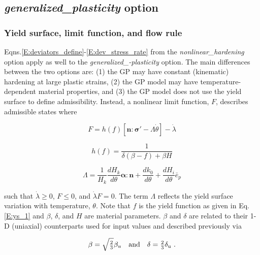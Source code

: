 \documentclass[11pt]{report}
\numberwithin{equation}{section}
\newcommand{\bmf } {\boldsymbol }
\newcommand{\bsf } [1]{\textrm{\textit{#1}}\xspace}
\begin{document}
\subsection {\bsf{generalized\_plasticity} option}
\subsubsection {Yield surface, limit function, and flow rule}
Eqns.\;\eqref{E:deviators_define}-\eqref{E:dev_stress_rate}
from the \textit{nonlinear\_hardening} option apply as well to the 
\textit{generalized\_-plasticity} option. The main differences between the two 
options are: (1) the GP may have constant (kinematic)
hardening at large plastic strains,  (2) the GP model may have temperature-dependent 
material properties,  and (3) the GP
model does not use the 
yield surface to define admissibility. Instead, a nonlinear 
limit function, $F$, describes admissible states where 

\begin{equation}
F = h(f)\left[ {\bmf{n}}:{\bmf{\sigma }}' -\Lambda \dot{\theta}  \right] - \dot \lambda 
\end{equation}

\begin{equation}
h(f) = \frac{1}{{\delta \left( {\beta  - f} \right) + \beta H }}
\end{equation}

\begin{equation}
\Lambda = \dfrac{1}{H_{k}}\dfrac{dH_{k}}{d\theta}\boldsymbol{\alpha}:\boldsymbol{n}
 +\frac{dk_{0}}{d\theta}+\frac{dH_{i}}{d\theta}\bar{e}_{p}
\end{equation}

\noindent such that $\dot \lambda \ge 0$, $F \le 0$, and $\dot \lambda F =0$. 
The term $\Lambda$ reflects the yield surface variation with temperature, $\theta$. 
Note that $f$ is the yield function as given in Eq. \eqref{E:ys_1} and
$\beta$, $ \delta$, and $ H$ are material parameters. $\beta$ 
and $\delta$ are related to their 1-D (uniaxial) counterparts used for 
input values and described previously via


\begin{equation}
\beta   = \textstyle  \sqrt {\frac{2}{3}} \displaystyle
 \beta_u  \quad \rm{and} \quad 
\delta  = \textstyle \frac{2}{3} \displaystyle \delta_u~.
\end{equation}
\end{document}
